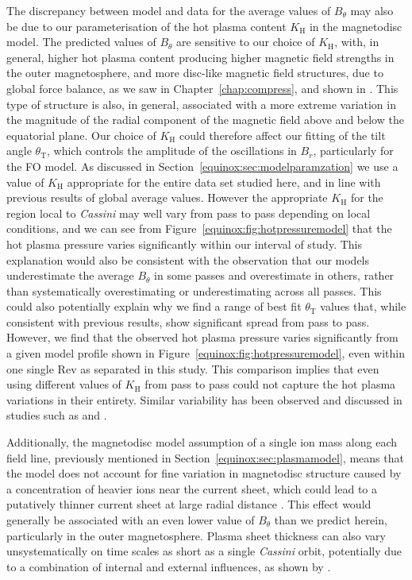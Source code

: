 The discrepancy between model and data for the average values of $B_{\theta}$ may also be due to our parameterisation of the hot plasma content $K_\mathrm{H}$ in the magnetodisc model. The predicted values of $B_{\theta}$ are sensitive to our choice of $K_\mathrm{H}$, with, in general, higher hot plasma content producing higher magnetic field strengths in the outer magnetosphere, and more disc-like magnetic field structures, due to global force balance, as we saw in Chapter~\ref{chap:compress}, and shown in \citet{achilleos2010b}. This type of structure is also, in general, associated with a more extreme variation in the magnitude of the radial component of the magnetic field above and below the equatorial plane. Our choice of $K_\mathrm{H}$ could therefore affect our fitting of the tilt angle $\theta_\mathrm{T}$, which controls the amplitude of the oscillations in $B_r$, particularly for the FO model. As discussed in Section~\ref{equinox:sec:modelparamzation} we use a value of $K_\mathrm{H}$ appropriate for the entire data set studied here, and in line with previous results of global average values. However the appropriate $K_\mathrm{H}$ for the region local to \textit{Cassini} may well vary from pass to pass depending on local conditions, and we can see from Figure~\ref{equinox:fig:hotpressuremodel} that the hot plasma pressure varies significantly within our interval of study. This explanation would also be consistent with the observation that our models underestimate the average $B_{\theta}$ in some passes and overestimate in others, rather than systematically overestimating or underestimating across all passes. This could also potentially explain why we find a range of best fit $\theta_\mathrm{T}$ values that, while consistent with previous results, show significant spread from pass to pass. However, we find that the observed hot plasma pressure varies significantly from a given model profile shown in Figure~\ref{equinox:fig:hotpressuremodel}, even within one single Rev as separated in this study. This comparison implies that even using different values of $K_\mathrm{H}$ from pass to pass could not capture the hot plasma variations in their entirety. Similar variability has been observed and discussed in studies such as \citet{sergis2007} and \citet{kellett2010}.

Additionally, the magnetodisc model assumption of a single ion mass along each field line, previously mentioned in Section~\ref{equinox:sec:plasmamodel}, means that the model does not account for fine variation in magnetodisc structure caused by a concentration of heavier ions near the current sheet, which could lead to a putatively thinner current sheet at large radial distance \citep{nemeth2011}. This effect would generally be associated with an even lower value of $B_{\theta}$ than we predict herein, particularly in the outer magnetosphere. Plasma sheet thickness can also vary unsystematically on time scales as short as a single \textit{Cassini} orbit, potentially due to a combination of internal and external influences, as shown by \citet{sergis2011}.

